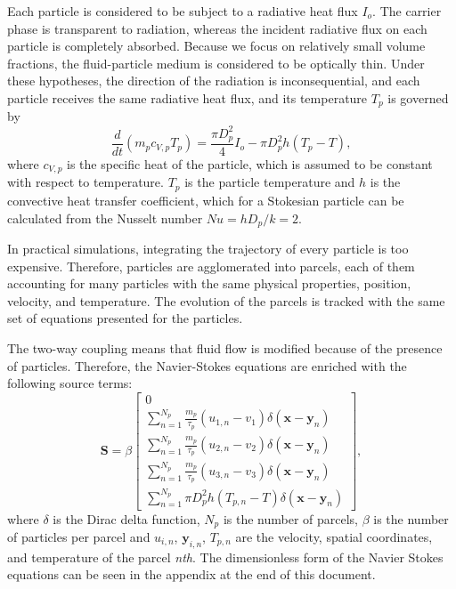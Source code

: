 \documentclass[a4paper,10pt]{report}
\begin{document}
Each particle is considered to be subject to a radiative heat flux $I_o$. The carrier phase is transparent to radiation, whereas the incident radiative flux on each particle is completely absorbed. Because we focus on relatively small volume fractions, the fluid-particle medium is considered to be optically thin. Under these hypotheses, the direction of the radiation is inconsequential, and each particle receives the same radiative heat flux, and its temperature $T_p$ is governed by
\begin{equation}
\label{eq:part_energy}
\frac{d}{dt} (m_p c_{V,p} T_p) = \frac{\pi D_p^2}{4} I_o - \pi D_p^2 h (T_p-T),
\end{equation}
where $c_{V,p}$ is the specific heat of the particle, which is assumed to be constant with respect to temperature. $T_p$ is the particle temperature and $h$ is the convective heat transfer coefficient, which for a Stokesian particle can be calculated from the Nusselt number $Nu = hD_p/k = 2$.

In practical simulations, integrating the trajectory of every particle is too expensive. Therefore, particles are agglomerated into parcels, each of them accounting for many particles with the same physical properties, position, velocity, and temperature. The evolution of the parcels is tracked with the same set of equations presented for the particles.

The two-way coupling means that fluid flow is modified because of the presence of particles. Therefore, the Navier-Stokes equations are enriched with the following source terms:
%
\begin{equation}
\boldsymbol{S} = \beta\left[\begin{array}{c} 0 \\
                                                                       \sum_{n=1}^{N_p} \frac{m_p}{\tau_p} (u_{1,n}-v_1)\delta(\mathbf{x} - \mathbf{y}_n)  \\
                                                                       \sum_{n=1}^{N_p} \frac{m_p}{\tau_p} (u_{2,n}-v_2)\delta(\mathbf{x} - \mathbf{y}_n) \\
                                                                      \sum_{n=1}^{N_p} \frac{m_p}{\tau_p} (u_{3,n}-v_3)\delta(\mathbf{x} - \mathbf{y}_n) \\
                                                                      \sum_{n=1}^{N_p} \pi D_p^2 h (T_{p,n} - T) \delta(\mathbf{x} - \mathbf{y}_n )
\end{array}\right],
\label{eq:particlessource}
\end{equation}
%
where $\delta$ is the Dirac delta function, $N_p$ is the number of parcels, $\beta$ is the number of particles per parcel and $u_{i,n}$, $\mathbf{y}_{i,n}$, $T_{p,n}$ are the velocity, spatial coordinates, and temperature of the parcel \emph{nth}.
The dimensionless form of the Navier Stokes equations can be seen in the appendix at the end of this document. 
\end{document}
